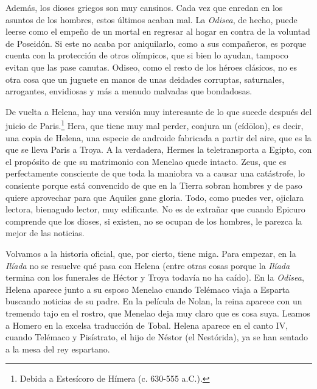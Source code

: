 

Además, los dioses griegos son muy cansinos. Cada vez que enredan en los asuntos de los hombres, estos últimos acaban mal. La \emph{Odisea}, de hecho, puede leerse como el empeño de un mortal en regresar al hogar en contra de la voluntad de Poseidón. Si este no acaba por aniquilarlo, como a sus compañeros, es porque cuenta con la protección de otros olímpicos, que si bien lo ayudan, tampoco evitan que las pase canutas. Odiseo, como el resto de los héroes clásicos, no es otra cosa que un juguete en manos de unas deidades corruptas, saturnales, arrogantes, envidiosas y más a menudo malvadas que bondadosas.

De vuelta a Helena, hay una versión muy interesante de lo que sucede después del juicio de Paris.\footnote{Debida a Estesícoro de Hímera (c. 630-555 a.C.).} Hera, que tiene muy mal perder, conjura un  (eídōlon), es decir, una copia de Helena, una especie de androide fabricada a partir del aire, que es la que se lleva Paris a Troya. A la verdadera, Hermes la teletransporta a Egipto, con el propósito de que su matrimonio con Menelao quede intacto. Zeus, que es perfectamente consciente de que toda la maniobra va a causar una catástrofe, lo consiente porque está convencido de que en la Tierra sobran hombres y de paso quiere aprovechar para que Aquiles gane gloria. Todo, como puedes ver, ojiclara lectora, bienagudo lector, muy edificante. No es de extrañar que cuando Epicuro comprende que los dioses, si existen, no se ocupan de los hombres, le parezca la mejor de las noticias.

Volvamos a la historia oficial, que, por cierto, tiene miga. Para empezar, en la \emph{Ilíada} no se resuelve qué pasa con Helena (entre otras cosas porque la \emph{Ilíada} termina con los funerales de Héctor y Troya todavía no ha caído). En la \emph{Odisea}, Helena aparece junto a su esposo Menelao cuando Telémaco viaja a Esparta buscando noticias de su padre. En la película de Nolan, la reina aparece con un tremendo tajo en el rostro, que Menelao deja muy claro que es cosa suya. Leamos a Homero en la excelsa traducción de Tobal. Helena aparece en el canto IV, cuando Telémaco y Pisístrato, el hijo de Néstor (el Nestórida), ya se han sentado a la mesa del rey espartano.

